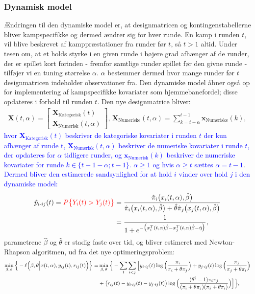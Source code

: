 \documentclass[11pt,a4paper]{article}
\begin{document}
\subsubsection{Dynamisk model}
Ændringen til den dynamiske model er, at designmatricen og kontingenstabellerne bliver kampspecifikke og dermed ændrer sig for hver runde. En kamp i runden $t$, vil blive beskrevet af kamppræstationer fra runder før $t$, så $t>1$ altid. Under tesen om, at et holds styrke i en given runde i højere grad afhænger af de runder, der er spillet kort forinden - fremfor samtlige runder spillet før den givne runde - tilføjer vi en tuning størrelse $\alpha$. $\alpha$ bestemmer dermed hvor mange runder før $t$ designmatricen indeholder observationer fra. Den dynamiske model åbner også op for implementering af kampspecifikke kovariater som hjemmebanefordel; disse opdateres i forhold til runden $t$. Den nye designmatrice bliver:
\begin{align*}
\textbf{X}(t,\alpha)=\begin{bmatrix}
\textbf{X}_{\text{Kategorisk}}(t)\\
\textbf{X}_{\text{Numerisk}}(t,\alpha)
\end{bmatrix}\text{,   }\textbf{X}_{\text{Numeriske}}(t,\alpha)=\sum_{k=t-\alpha}^{t-1}\textbf{x}_{\text{Numeriske}}(k),
\end{align*}
\textcolor{blue}{hvor $\textbf{X}_{\text{Kategorisk}}(t)$ beskriver de kategoriske kovariater i runden $t$ der kun afhænger af runde t, $\textbf{X}_{\text{Numerisk}}(t,\alpha)$ beskriver de numeriske kovariater i runde $t$, der opdateres for $\alpha$ tidligere runder, og $\textbf{x}_{\text{Numerisk}}(k)$ beskriver de numeriske kovariater for runde $k\in \{t-1-\alpha;t-1\}$. $\alpha\geq1$ og hvis $\alpha\geq t$ sættes $\alpha=t-1$}.
\textcolor{blue}{Dermed bliver den estimerede sandsynlighed for at hold $i$ vinder over hold $j$ i den dynamiske model:}
\begin{align*}
\hat{p}_{i\cdot ij}(t)=\textcolor{red}{P\big{\{}Y_{i}(t)>Y_{j}(t)\big{\}}}&=\frac{\hat{\pi}_i\big{(}x_i(t,\alpha),\hat{\beta}\big{)}}{\hat{\pi}_i\big{(}x_i(t,\alpha),\hat{\beta}\big{)}+\hat{\theta}\hat{\pi}_j\big{(}x_j(t,\alpha),\hat{\beta}\big{)}}\\
&=\frac{1}{1+e^{-\big{(}x_i^T(t,\alpha)\hat{\beta}-x_j^T(t,\alpha)\hat{\beta}-\hat{\eta}\big{)}}},
\end{align*}
parametrene $\hat{\beta}$ og $\hat{\theta}$ er stadig faste over tid, og bliver estimeret med Newton-Rhapson algoritmen, ud fra det nye optimeringsproblem:
\begin{align*}
\min_{\beta,\,\theta} \Big{\{}-\ell\Big{(}\beta,\theta\Big{|}x(t,\alpha),y_{ij}(t),r_{ij}(t)\Big{)}\Big{\}}=&\min_{\beta,\,\theta} \Big{\{}- \sum_{t}\sum_{i<j}\Big{[}y_{i\cdot ij}(t)\log\Big{(}\frac{\pi_i}{\pi_i+\theta\pi_j}\Big{)}
+ y_{j\cdot ij}(t)\log\Big{(}\frac{\pi_j}{\pi_j+\theta\pi_i}\Big{)}\\
&+ \big{(}r_{ij}(t)-y_{i\cdot ij}(t)-y_{j\cdot ij}(t)\big{)} \log\Big{(}\frac{(\theta^2-1)\pi_i \pi_j}{(\pi_i+\theta\pi_j)(\pi_j+\theta\pi_i)}\Big{)}\Big{]}\Big{\}},
\end{align*}
\end{document}
